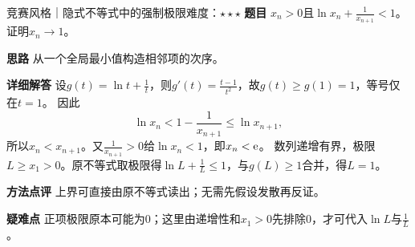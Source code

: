 \begin{example}{竞赛风格｜隐式不等式中的强制极限}{难度：$\star\star\star$}\label{cs:ex:forced}
\textbf{题目} $x_n>0$且$\ln x_n+\frac{1}{x_{n+1}}<1$。证明$x_n\to1$。
\par\textbf{思路} 从一个全局最小值构造相邻项的次序。
\par\textbf{详细解答} 设$g(t)=\ln t+\frac{1}{t}$，则$g'(t)=\frac{t-1}{t^2}$，故$g(t)\ge g(1)=1$，等号仅在$t=1$。
因此
\[
\ln x_n<1-\dfrac1{x_{n+1}}\le\ln x_{n+1},
\]
所以$x_n<x_{n+1}$。又$\frac{1}{x_{n+1}}>0$给$\ln x_n<1$，即$x_n<\mathrm{e}$。
数列递增有界，极限$L\ge x_1>0$。原不等式取极限得$\ln L+\frac{1}{L}\le1$，与$g(L)\ge1$合并，得$L=1$。
\par\textbf{方法点评} 上界可直接由原不等式读出；无需先假设发散再反证。
\par\textbf{疑难点} 正项极限原本可能为0；这里由递增性和$x_1>0$先排除0，才可代入$\ln L$与$\frac{1}{L}$。
\end{example}

